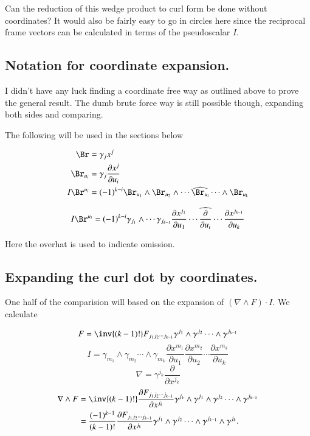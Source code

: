 \documentclass{article}
\newcommand{\grad}[0]{\nabla}
\newcommand{\PD}[2]{\frac{\partial {#2}}{\partial {#1}}}
\begin{document}
Can the reduction of this wedge product to curl form be done without coordinates?  It would also be fairly easy to go in circles here since the reciprocal frame vectors can be calculated in terms of the pseudoscalar $I$.

\subsection{ Notation for coordinate expansion. }

I didn't have any luck finding a coordinate free way as outlined above to prove the general result.  The dumb brute force way is still possible though, expanding
both sides and comparing.

The following will be used in the sections below

\begin{align*}
\Br &= \gamma_j x^j \\
\Br_{u_i} &= \gamma_j \PD{u_i}{x^j} \\
I \Br^{u_i}
&= (-1)^{k-i} \Br_{u_1} \wedge \Br_{u_2} \wedge \cdots \widehat{\Br_{u_i}} \cdots \wedge \Br_{u_k} \\
\end{align*}

\begin{equation}\label{eqn:dA}
I \Br^{u_i}
= (-1)^{k-i} 
\gamma_{j_1} \wedge \cdots \gamma_{j_{k-1}} 
\PD{u_1}{x^{j_1}} \cdots \widehat{\PD{u_i}{}} \cdots \PD{u_k}{x^{j_{k-1}}}
\end{equation}

Here the overhat is used to indicate omission.

\subsection{ Expanding the curl dot by coordinates. }

One half of the comparision will based on the expansion of $(\grad \wedge F ) \cdot I$.  We calculate

\begin{equation*}
F = \inv{(k-1)!} F_{j_1 j_2 \cdots j_{k-1}} \gamma^{j_1} \wedge \gamma^{j_2} \cdots \wedge \gamma^{j_{k-1}}
\end{equation*}
\begin{equation*}
I = \gamma_{m_1} \wedge \gamma_{m_2} \cdots \wedge \gamma_{m_{k}} \PD{u_1}{x^{m_1}} \PD{u_2}{x^{m_2}} \cdots \PD{u_k}{x^{m_k}}
\end{equation*}
\begin{equation*}
\grad = \gamma^{j_k} \PD{x^{j_k}}{}
\end{equation*}
\begin{align*}
\grad \wedge F 
&= \inv{(k-1)!} \PD{x^{j_{k}}}{F_{j_1 j_2 \cdots j_{k-1}}} \gamma^{j_k} \wedge \gamma^{j_1} \wedge \gamma^{j_2} \cdots \wedge \gamma^{j_{k-1}} \\
&= \frac{(-1)^{k-1}}{(k-1)!} \PD{x^{j_{k}}}{F_{j_1 j_2 \cdots j_{k-1}}}
\gamma^{j_1} \wedge \gamma^{j_2} \cdots \wedge \gamma^{j_{k-1}} \wedge \gamma^{j_k}.
\end{align*}
\end{document}
